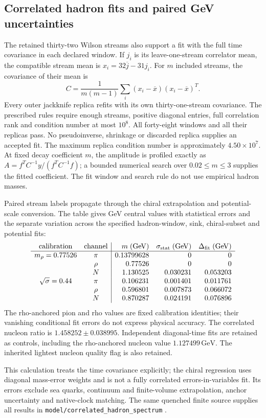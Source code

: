 \subsection{Correlated hadron fits and paired GeV uncertainties}

The retained thirty-two Wilson streams also support a fit with the full
time covariance in each declared window. If $j_i$ is its leave-one-stream
correlator mean, the compatible stream mean is
$x_i=32\overline j-31j_i$. For $m$ included streams, the covariance of
their mean is
\[
 C=\frac{1}{m(m-1)}\sum_i(x_i-\overline x)(x_i-\overline x)^T.
\]
Every outer jackknife replica refits with its own thirty-one-stream
covariance. The prescribed rules require enough streams, positive
diagonal entries, full correlation rank and condition number at most
$10^8$. All forty-eight windows and all their replicas pass. No
pseudoinverse, shrinkage or discarded replica supplies an accepted fit.
The maximum replica condition number is approximately $4.50\times10^7$.
At fixed decay coefficient $m$, the amplitude is profiled exactly as
$A=f^TC^{-1}y/(f^TC^{-1}f)$; a bounded numerical search over
$0.02\le m\le3$ supplies the fitted coefficient. The fit window and
search rule do not use empirical hadron masses.

Paired stream labels propagate through the chiral extrapolation and
potential-scale conversion. The table gives GeV central values with
statistical errors and the separate variation across the specified
hadron-window, sink, chiral-subset and potential fits:
\[
\begin{array}{cc|rrr}
 \text{calibration}&\text{channel}&m\;(\mathrm{GeV})&
 \sigma_{\rm stat}\;(\mathrm{GeV})&\Delta_{\rm fit}\;(\mathrm{GeV})\\ \hline
 m_\rho=0.77526&\pi&0.13799628&0&0\\
 &\rho&0.77526&0&0\\
 &N&1.130525&0.030231&0.053203\\
 \sqrt\sigma=0.44&\pi&0.106231&0.001401&0.011761\\
 &\rho&0.596801&0.007873&0.066072\\
 &N&0.870287&0.024191&0.076896
\end{array}
\]
The rho-anchored pion and rho values are fixed calibration identities;
their vanishing conditional fit errors do not express physical accuracy.
The correlated nucleon ratio is $1.458252\pm0.038995$. Independent
diagonal-time fits are retained as controls, including the rho-anchored
nucleon value $1.127499\,\mathrm{GeV}$. The inherited lightest nucleon
quality flag is also retained.

This calculation treats the time covariance explicitly; the chiral
regression uses diagonal mass-error weights and is not a fully correlated
errors-in-variables fit. Its errors exclude sea quarks, continuum and
finite-volume extrapolation, anchor uncertainty and native-clock
matching. The same quenched finite source supplies all results in
\texttt{model/correlated\_hadron\_spectrum} \cite{ophrepo}.
